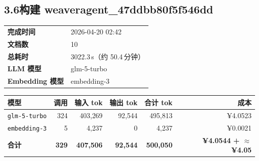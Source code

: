 \documentclass[11pt]{article}
\begin{document}
\subsection*{3.6\;构建 weaveragent\_47ddbb80f5f546dd}
\noindent\begin{minipage}{\textwidth}
\begin{tabular}{@{}ll@{}}
\textbf{完成时间} & 2026-04-20 02:42 \\
\textbf{文档数} & 10 \\
\textbf{总耗时} & 3022.3\,s（约 50.4\,分钟） \\
\textbf{LLM 模型} & glm-5-turbo \\
\textbf{Embedding 模型} & embedding-3 \\
\end{tabular}
\end{minipage}
\par\vspace{0.25cm}
\noindent\begin{tabularx}{\textwidth}{@{}X r r r r r@{}}
\toprule
\rowcolor{headerbg!10}\textbf{模型} & \textbf{调用} & \textbf{输入 tok} & \textbf{输出 tok} & \textbf{合计 tok} & \textbf{成本} \\
\midrule
\rowcolor{rowalt}\texttt{\small glm-5-turbo} & 324 & 403{,}269 & 92{,}544 & 495{,}813 & ¥4.0523 \\
\texttt{\small embedding-3} & 5 & 4{,}237 & 0 & 4{,}237 & ¥0.0021 \\
\midrule
\rowcolor{headerbg!15}\textbf{合计} & \textbf{329} & \textbf{407{,}506} & \textbf{92{,}544} & \textbf{500{,}050} & \textbf{¥4.0544 + $\approx$ ¥4.05} \\
\bottomrule
\end{tabularx}
\vspace{0.5cm}
\end{document}
